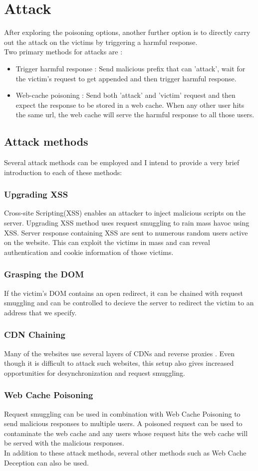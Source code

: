 \section{Attack}
After exploring the poisoning options, another further option is to directly carry out the attack on the victims by triggering a harmful response. \\
Two primary methods for attacks are :
\begin{itemize}
	\item Trigger harmful response : Send malicious prefix that can 'attack', wait for the victim's request to get appended and then trigger harmful response. 
	\item Web-cache poisoning : Send both 'attack' and 'victim' request and then expect the response to be stored in a web cache. When any other user hits the same url, the web cache will serve the harmful response to all those users. 
\end{itemize}

\subsection{Attack methods}
Several attack methods can be employed and I intend to provide a very brief introduction to each of these methods:
\subsubsection{Upgrading XSS}
Cross-site Scripting(XSS) \cite{b11} enables an attacker to inject malicious scripts on the server. Upgrading XSS method uses request smuggling to rain mass havoc using XSS. Server response containing XSS are sent to numerous random users active on the website. This can exploit the victims in mass and can reveal authentication and cookie information of those victims.  
\subsubsection{Grasping the DOM}
If the victim's DOM \cite{b20} contains an open redirect, it can be chained with request smuggling and can be controlled to decieve the server to redirect the victim to an address that we specify.  
\subsubsection{CDN Chaining}
Many of the websites use several layers of CDNs \cite{b12} and reverse proxies \cite{b13}. Even though it is difficult to attack such websites, this setup also gives increased opportunities for desynchronization and request smuggling.
\subsubsection{Web Cache Poisoning}
Request smuggling can be used in combination with Web Cache Poisoning \cite{b14} to send malicious responses to multiple users. A poisoned request can be used to contaminate the web cache and any users whose request hits the web cache will be served with the malicious responses. \\

In addition to these attack methods, several other methods such as Web Cache Deception can also be used. 